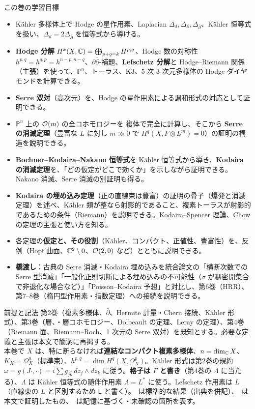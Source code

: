 \begin{goalbox}{この巻の学習目標}
\begin{itemize}
\item Kähler 多様体上で Hodge の星作用素、Laplacian $\Delta_d,\Delta_\partial,\Delta_{\bar\partial}$、Kähler 恒等式を扱い、$\Delta_d=2\Delta_{\bar\partial}$ を恒等式から導ける。
\item \textbf{Hodge 分解} $H^k(X,\mathbb C)=\bigoplus_{p+q=k}H^{p,q}$、Hodge 数の対称性 $h^{p,q}=h^{q,p}=h^{n-p,n-q}$、$\partial\bar\partial$-補題、\textbf{Lefschetz 分解}と Hodge--Riemann 関係（主張）を使って、$\mathbb P^n$、トーラス、K3、5 次 3 次元多様体の Hodge ダイヤモンドを計算できる。
\item \textbf{Serre 双対}（高次元）を、Hodge の星作用素による調和形式の対応として証明できる。
\item $\mathbb P^n$ 上の $\mathcal O(m)$ の全コホモロジーを \Cech{} 複体で完全に計算し、そこから \textbf{Serre の消滅定理}（豊富な $L$ に対し $m\gg0$ で $H^q(X,F\otimes L^m)=0$）の証明の構造を説明できる。
\item \textbf{Bochner--Kodaira--Nakano 恒等式}を Kähler 恒等式から導き、\textbf{Kodaira の消滅定理}を、「どの仮定がどこで効くか」を示しながら証明できる。Nakano 消滅、Serre 消滅の別証明も得る。
\item \textbf{Kodaira の埋め込み定理}（正の直線束は豊富）の証明の骨子（爆発と消滅定理）を述べ、Kähler 類が整なら射影的であること、複素トーラスが射影的であるための条件（Riemann）を説明できる。Kodaira--Spencer 理論、Chow の定理の主張と使い方を知る。
\item 各定理の\textbf{仮定と、その役割}（Kähler、コンパクト、正値性、豊富性）を、反例（Hopf 曲面、$\mathbb C^2\setminus0$、$\mathcal O(2,0)$ など）とともに説明できる。
\item \textbf{橋渡し}：古典の Serre 消滅・Kodaira 埋め込みを統合論文の「横断次数での Serre 型消滅」「一般化正則切断による埋め込みの不可能性（$\sigma$ が稠密開集合で非退化な場合など）」「Poisson--Kodaira 予想」と対比し、第6巻（HRR）、第7--8巻（楕円型作用素・指数定理）への接続を説明できる。
\end{itemize}
\end{goalbox}
\begin{goalbox}{前提と記法}
第2巻（複素多様体、$\bar\partial$、Hermite 計量・Chern 接続、Kähler 形式）、第3巻（層、\Cech{}・層コホモロジー、Dolbeault の定理、Leray の定理）、第4巻（Riemann 面、Riemann--Roch、1 次元の Serre 双対）を既知とする。必要な定義と主張は本文で簡潔に再掲する。\\
本巻で $X$ は、特に断らなければ\textbf{連結なコンパクト複素多様体}、$n=\dim_{\mathbb C}X$、$K_X=\Omega^n_X$（標準束）、$h^{p,q}=\dim H^q(X,\Omega^p_X)$。Kähler 形式は第2巻の規約
$\omega=g(J\cdot,\cdot)=i\sum g_{j\bar k}\,dz_j\wedge d\bar z_k$ に従う。\textbf{格子は $\Gamma$ と書き}（第4巻の $\Lambda$ に当たる）、$\Lambda$ は Kähler 恒等式の随伴作用素 $\Lambda=L^*$ に使う。Lefschetz 作用素は $L$（直線束の $L$ と区別するため $\mathsf L$ と書く）。\tC\ は標準的な結果（出典を併記）、\tP\ は本文で証明したもの、\tQ\ は記憶に基づく・未確認の箇所を表す。
\end{goalbox}
\tableofcontents
\newpage
